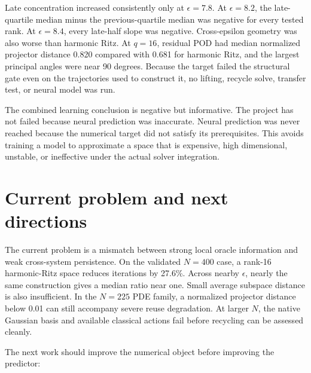 \documentclass[11pt]{article}
\begin{document}
Late concentration increased consistently only at $\epsilon=7.8$. At $\epsilon=8.2$, the late-quartile median minus the previous-quartile median was negative for every tested rank. At $\epsilon=8.4$, every late-half slope was negative. Cross-epsilon geometry was also worse than harmonic Ritz. At $q=16$, residual POD had median normalized projector distance 0.820 compared with 0.681 for harmonic Ritz, and the largest principal angles were near 90 degrees. Because the target failed the structural gate even on the trajectories used to construct it, no lifting, recycle solve, transfer test, or neural model was run.

The combined learning conclusion is negative but informative. The project has not failed because neural prediction was inaccurate. Neural prediction was never reached because the numerical target did not satisfy its prerequisites. This avoids training a model to approximate a space that is expensive, high dimensional, unstable, or ineffective under the actual solver integration.

\section{Current problem and next directions}

The current problem is a mismatch between strong local oracle information and weak cross-system persistence. On the validated $N=400$ case, a rank-16 harmonic-Ritz space reduces iterations by 27.6\%. Across nearby $\epsilon$, nearly the same construction gives a median ratio near one. Small average subspace distance is also insufficient. In the $N=225$ PDE family, a normalized projector distance below 0.01 can still accompany severe reuse degradation. At larger $N$, the native Gaussian basis and available classical actions fail before recycling can be assessed cleanly.

The next work should improve the numerical object before improving the predictor:
\end{document}
